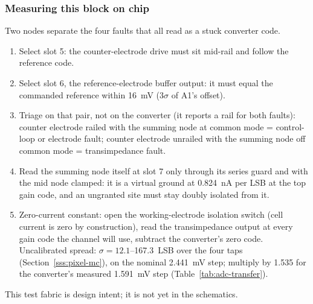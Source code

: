 %

\subsubsection{Measuring this block on chip}

Two nodes separate the four faults that all read as a stuck converter code.
\begin{enumerate}[nosep]
\item Select slot 5: the counter-electrode drive must sit mid-rail and follow
  the reference code.
\item Select slot 6, the reference-electrode buffer output: it must equal the
  commanded reference within \SI{16}{\milli\volt} (\(3\sigma\) of A1's
  offset).
\item Triage on that pair, not on the converter (it reports a rail for both
  faults): counter electrode railed with the summing node at common mode =
  control-loop or electrode fault; counter electrode unrailed with the summing
  node off common mode = transimpedance fault.
\item Read the summing node itself at slot 7 only through its series guard and
  with the mid node clamped: it is a virtual ground at
  \SI{0.824}{\nano\ampere} per LSB at the top gain code, and an ungranted site
  must stay doubly isolated from it.
\item Zero-current constant: open the working-electrode isolation switch (cell
  current is zero by construction), read the transimpedance output at every
  gain code the channel will use, subtract the converter's zero code.
  Uncalibrated spread: \(\sigma = 12.1\)--\SI{167.3}{LSB} over the four taps
  (Section~\ref{sss:pixel-mc}), on the nominal \SI{2.441}{\milli\volt} step;
  multiply by \num{1.535} for the converter's measured
  \SI{1.591}{\milli\volt} step (Table~\ref{tab:adc-transfer}).
\end{enumerate}
This test fabric is design intent; it is not yet in the schematics.

